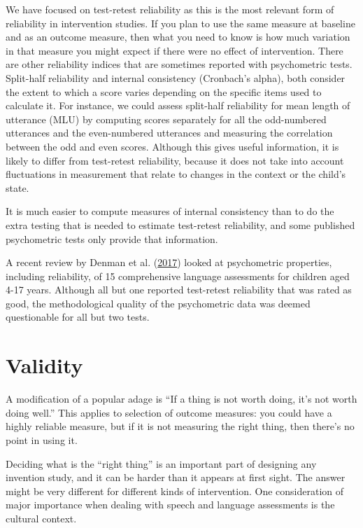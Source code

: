 \documentclass{krantz}
\begin{document}
We have focused on test-retest reliability as this is the most relevant form of reliability in intervention studies. If you plan to use the same measure at baseline and as an outcome measure, then what you need to know is how much variation in that measure you might expect if there were no effect of intervention. There are other reliability indices that are sometimes reported with psychometric tests. Split-half reliability and internal consistency (Cronbach's alpha), both consider the extent to which a score varies depending on the specific items used to calculate it. For instance, we could assess split-half reliability for mean length of utterance (MLU) by computing scores separately for all the odd-numbered utterances and the even-numbered utterances and measuring the correlation between the odd and even scores. Although this gives useful information, it is likely to differ from test-retest reliability, because it does not take into account fluctuations in measurement that relate to changes in the context or the child's state.

It is much easier to compute measures of internal consistency than to do the extra testing that is needed to estimate test-retest reliability, and some published psychometric tests only provide that information.

A recent review by Denman et al. (\protect\hyperlink{ref-denman2017}{2017}) looked at psychometric properties, including reliability, of 15 comprehensive language assessments for children aged 4-17 years. Although all but one reported test-retest reliability that was rated as good, the methodological quality of the psychometric data was deemed questionable for all but two tests.

\hypertarget{validity}{%
\section{Validity}\label{validity}}

A modification of a popular adage is ``If a thing is not worth doing, it's not worth doing well.'' This applies to selection of outcome measures: you could have a highly reliable measure, but if it is not measuring the right thing, then there's no point in using it.

Deciding what is the ``right thing'' is an important part of designing any invention study, and it can be harder than it appears at first sight. The answer might be very different for different kinds of intervention. One consideration of major importance when dealing with speech and language assessments is the cultural context.
\end{document}

